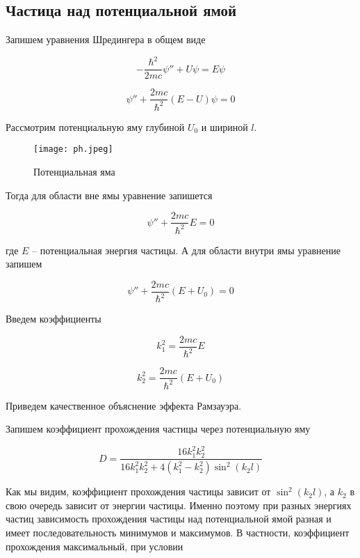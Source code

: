     \subsection*{Частица над потенциальной ямой}

    Запишем уравнения Шредингера в общем виде

    \begin{equation}
        -\frac{\hbar^2}{2mc} \psi'' + U \psi = E \psi
    \end{equation}

    \[ \psi'' + \frac{2mc}{\hbar^2}(E - U) \psi = 0 \]

    Рассмотрим потенциальную яму глубиной $U_0$ и шириной $l$.

    \begin{figure}
        \centering
        \texttt{[image: ph.jpeg]}
        \caption{Потенциальная яма}
        \label{fig:ph}
    \end{figure}

    Тогда для области вне ямы уравнение запишется

    \begin{equation}
        \psi'' + \frac{2mc}{\hbar^2} E = 0
    \end{equation}

    где $E$ -- потенциальная энергия частицы. А для области внутри ямы уравнение запишем

    \begin{equation}
        \psi'' + \frac{2mc}{\hbar^2}(E + U_0) = 0
    \end{equation}

    Введем коэффициенты

    \begin{equation}
        k_1^2 = \frac{2mc}{\hbar^2} E
    \end{equation}

    \begin{equation}
        k_2^2 = \frac{2mc}{\hbar^2}(E + U_0)
    \end{equation}

    Приведем качественное объяснение эффекта Рамзауэра.

    Запишем коэффициент прохождения частицы через потенциальную яму

    \begin{equation}
        D = \frac{16 k_1^2 k_2^2}{16 k_1^2 k_2^2 + 4(k_1^2 - k_2^2) \sin^2 (k_2 l)}
    \end{equation}

    Как мы видим, коэффициент прохождения частицы зависит от $\sin^2 (k_2 l)$, а $k_2$ в свою очередь зависит от энергии
    частицы. Именно поэтому при разных энергиях частиц зависимость прохождения частицы над потенциальной ямой разная и имеет
    последовательность минимумов и максимумов. В частности, коэффициент прохождения максимальный, при условии

